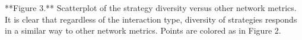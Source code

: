 **Figure 3.** Scatterplot of the strategy diversity versus other network
metrics. It is clear that regardless of the interaction type, diversity of
strategies responds in a similar way to other network metrics. Points are
colored as in Figure 2.
